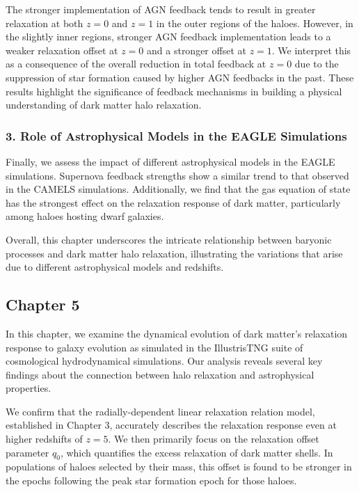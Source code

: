 \documentclass[a4paper, 12pt, oneside]{Thesis}  %
\begin{document}
The stronger implementation of AGN feedback tends to result in greater relaxation at both \( z=0 \) and \( z=1 \) in the outer regions of the haloes. However, in the slightly inner regions, stronger AGN feedback implementation leads to a weaker relaxation offset at \( z=0 \) and a stronger offset at \( z=1 \). We interpret this as a consequence of the overall reduction in total feedback at \( z=0 \) due to the suppression of star formation caused by higher AGN feedbacks in the past. These results highlight the significance of feedback mechanisms in building a physical understanding of dark matter halo relaxation.

\subsubsection*{3. Role of Astrophysical Models in the EAGLE Simulations}
Finally, we assess the impact of different astrophysical models in the EAGLE simulations. Supernova feedback strengths show a similar trend to that observed in the CAMELS simulations. Additionally, we find that the gas equation of state has the strongest effect on the relaxation response of dark matter, particularly among haloes hosting dwarf galaxies.

Overall, this chapter underscores the intricate relationship between baryonic processes and dark matter halo relaxation, illustrating the variations that arise due to different astrophysical models and redshifts.




\subsection*{Chapter 5}

In this chapter, we examine the dynamical evolution of dark matter's relaxation response to galaxy evolution as simulated in the IllustrisTNG suite of cosmological hydrodynamical simulations. Our analysis reveals several key findings about the connection between halo relaxation and astrophysical properties.

We confirm that the radially-dependent linear relaxation relation model, established in Chapter 3, accurately describes the relaxation response even at higher redshifts of \( z=5 \). We then primarily focus on the relaxation offset parameter \( q_0 \), which quantifies the excess relaxation of dark matter shells. In populations of haloes selected by their mass, this offset is found to be stronger in the epochs following the peak star formation epoch for those haloes.
\end{document}
